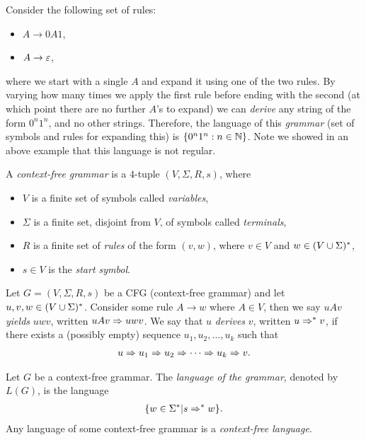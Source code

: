Consider the following set of rules:
\begin{itemize}
    \item $A \to 0A1$,
    \item $A \to \varepsilon$,
\end{itemize}
where we start with a single $A$ and expand it using one of the two rules. By varying how many times we apply the first rule before ending with the second (at which point there are no further $A$'s to expand) we can \emph{derive} any string of the form $0^{n}1^{n}$, and no other strings. Therefore, the language of this \emph{grammar} (set of symbols and rules for expanding this) is $\{0^{n}1^{n}: n \in \mathbb{N}\}$. Note we showed in an above example that this language is not regular.

\begin{defn}
    A \emph{context-free grammar} is a $4$-tuple $(V, \Sigma, R, s)$, where
    \begin{itemize}
        \item $V$ is a finite set of symbols called \emph{variables},
        \item $\Sigma$ is a finite set, disjoint from $V$, of symbols called \emph{terminals},
        \item $R$ is a finite set of \emph{rules} of the form $(v, w)$, where $v \in V$ and $w \in (V \cup \Sigma)^{*}$,
        \item $s \in V$ is the \emph{start symbol}.
    \end{itemize}
    Let $G = (V, \Sigma, R, s)$ be a CFG (context-free grammar) and let $u, v, w \in (V \cup \Sigma)^{*}$. Consider some rule $A \to w$ where $A \in V$, then we say $uAv$ \emph{yields} $uwv$, written $uAv \Rightarrow uwv$. We say that $u$ \emph{derives} $v$, written $u \Rightarrow^{*} v$, if there exists a (possibly empty) sequence $u_1, u_2, \ldots, u_k$ such that
    \begin{align*}
        u \Rightarrow u_1 \Rightarrow u_2 \Rightarrow \cdots \Rightarrow u_k  \Rightarrow v.
    \end{align*}
    
\end{defn}

\begin{defn}
    Let $G$ be a context-free grammar. The \emph{language of the grammar}, denoted by $L(G)$, is the language
    \begin{align*}
        \{w \in \Sigma^{*} | s \Rightarrow^{*} w\}.
    \end{align*}
    Any language of some context-free grammar is a \emph{context-free language}.
\end{defn}

